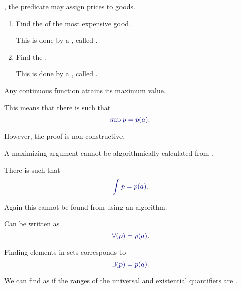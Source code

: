 \documentclass%
[%
Screen4to3,
]{foils}
\begin{document}
\vfill

, the  predicate may assign prices to goods. 

\begin{enumerate}
\item[\grey{1.}]
Find the  of the most expensive good.

\qquad This is
done by a , called \darkblue{$\sup$}.

\qquad {}

\item[\grey{2.}]
Find the .

\qquad This is done by a , called \darkblue{$\argsup$}.

\qquad {}
\end{enumerate}


Any continuous function  attains its
maximum value.

This means that there is  such that
\[
\darkblue{\sup p = p(a)}. 
\]

\vfill

However, the proof is non-constructive.

A maximizing argument  cannot be algorithmically
calculated from
. %



There is  such that
\[
\darkblue{\int p = p(a)}.
\]

\vfill

Again this  cannot be found from  using an algorithm. 


Can be written as
\[
\darkblue{\forall(p) = p(a)}.
\]

Finding elements in sets corresponds to
\[
\darkblue{\exists(p) = p(a)}.
\]

\vfill

We can find  as  if the
ranges of the universal and existential quantifiers are .

\end{document}
